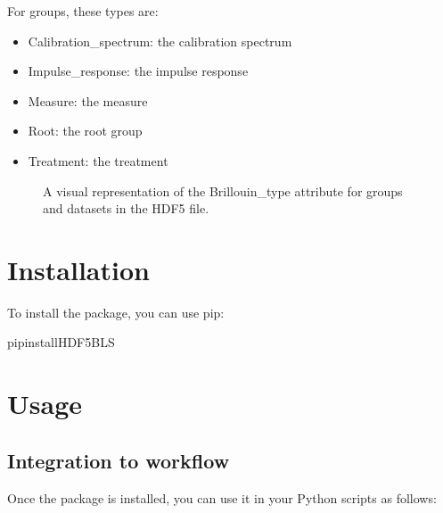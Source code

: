 \documentclass[letterpaper,10pt,english]{sphinxmanual}
\begin{document}
\sphinxAtStartPar
For groups, these types are:
\begin{itemize}
\item {} 
\sphinxAtStartPar
Calibration\_spectrum: the calibration spectrum

\item {} 
\sphinxAtStartPar
Impulse\_response: the impulse response

\item {} 
\sphinxAtStartPar
Measure: the measure

\item {} 
\sphinxAtStartPar
Root: the root group

\item {} 
\sphinxAtStartPar
Treatment: the treatment

\end{itemize}

\begin{figure}[htbp]
\centering
\capstart

\noindent{}
\caption{A visual representation of the Brillouin\_type attribute for groups and datasets in the HDF5 file.}\label{\detokenize{source/quickstart:id1}}\end{figure}


\section{Installation}
\label{\detokenize{source/quickstart:installation}}
\sphinxAtStartPar
To install the package, you can use pip:

\begin{sphinxVerbatim}[commandchars=\\\{\}]
pipinstallHDF5\PYGZus{}BLS
\end{sphinxVerbatim}


\section{Usage}
\label{\detokenize{source/quickstart:usage}}

\subsection{Integration to workflow}
\label{\detokenize{source/quickstart:integration-to-workflow}}
\sphinxAtStartPar
Once the package is installed, you can use it in your Python scripts as follows:
\end{document}
